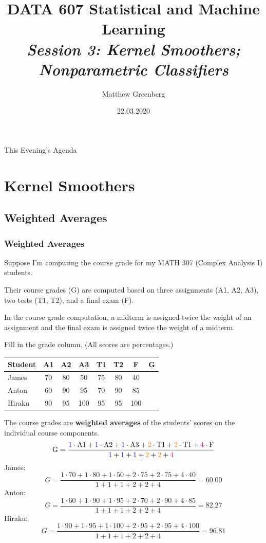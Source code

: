 \documentclass[xcolor={dvipsnames}]{beamer}
\title[DATA 607]{DATA 607 Statistical and Machine Learning\\
\textit{Session 3: Kernel Smoothers;\\Nonparametric Classifiers}}
\author{Matthew Greenberg}
\institute[]{Department of Mathematics and Statistics\\
University of Calgary}
\date{22.03.2020}
\begin{document}
\frame{\titlepage}

\begin{frame}{This Evening's Agenda}
    \setlength\parskip{0.5em}
    \tableofcontents
\end{frame}

\section{Kernel Smoothers}
\subsection{Weighted Averages}
\begin{frame}
    \frametitle{Weighted Averages}
    \setlength\parskip{0.75em}

    Suppose I'm computing the course grade for my MATH 307 (Complex Analysis I) students.
    
    Their course grades (G) are computed based on three assignments (A1, A2, A3), two tests (T1, T2), and a final exam (F).
    
    In the course grade computation, a midterm is assigned twice the weight of an assignment and the final exam is assigned twice the weight of a midterm.

    Fill in the grade column. (All scores are percentages.)

    \begin{center}
        \begin{tabular}{l|ccc|cc|c|c}
            \textbf{Student} & \textbf{A1} & \textbf{A2} & \textbf{A3} & \textbf{T1} & \textbf{T2} &\textbf{F} & \textbf{G}\\\hline 
            James&70&80&50&75&80&40&\\
            Anton&60&90&95&70&90&85&\\
            Hiraku&90&95&100&95&95&100\\
        \end{tabular}
    \end{center}
\end{frame}

\begin{frame}
The course grades are \textbf{weighted averages} of the students' scores
on the individual course components.
\[
    \text{G} = \frac{\textcolor{blue}{1}\cdot\text{A1} + 
    \textcolor{blue}{1}\cdot\text{A2} + 
    \textcolor{blue}{1}\cdot\text{A3} + 
    \textcolor{orange}{2}\cdot\text{T1} + 
    \textcolor{orange}{2}\cdot\text{T1} + 
    \textcolor{magenta}{4}\cdot\text{F}}
    {\textcolor{blue}{1} +
    \textcolor{blue}{1} +
    \textcolor{blue}{1} +
    \textcolor{orange}{2} +
    \textcolor{orange}{2} +
    \textcolor{magenta}{4}}
\]
James:
\[
    G = \frac{1\cdot 70 + 1\cdot 80 + 1\cdot 50 + 2\cdot 75 + 2\cdot 75 + 4\cdot 40}
    {1+1+1+2+2+4} = 60.00
\]
Anton:
\[
    G = \frac{1\cdot 60 + 1\cdot 90 + 1\cdot 95 + 2\cdot 70 + 2\cdot 90 + 4\cdot 85} 
    {1+1+1+2+2+4} = 82.27
\]
Hiraku:
\[
    G = \frac{1\cdot 90 + 1\cdot 95 + 1\cdot 100 + 2\cdot 95 + 2\cdot 95 + 4\cdot 100} 
    {1+1+1+2+2+4} = 96.81
\]
\end{frame}
\end{document}
